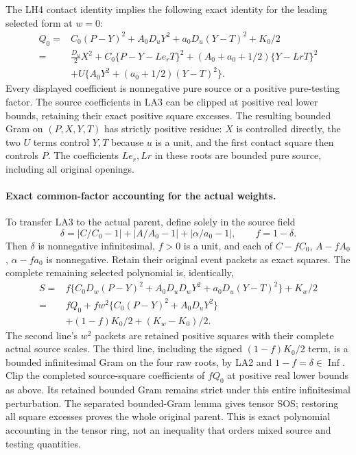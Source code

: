 The LH4 contact identity implies the following exact identity for
the leading selected form at $w=0$:
\[
\begin{split}
 Q_0={}&C_0(P-Y)^2+A_0D_uY^2+a_0D_u(Y-T)^2+K_0/2\\
 ={}&\frac{D_u}{2}X^2
       +C_0\{P-Y-Le_rT\}^2
       +(A_0+a_0+1/2)\{Y-LrT\}^2\\
 &+U\{A_0Y^2+(a_0+1/2)(Y-T)^2\}.
\end{split}                                                   \tag{LA3}
\]
Every displayed coefficient is nonnegative pure source or a positive
pure-testing factor.  The source coefficients in LA3 can be clipped
at positive real lower bounds, retaining their exact positive square
excesses.  The resulting bounded Gram on $(P,X,Y,T)$ has strictly
positive residue: $X$ is controlled directly, the two $U$ terms
control $Y,T$ because $u$ is a unit, and the first contact square
then controls $P$.  The coefficients $Le_r,Lr$ in these roots are
bounded pure source, including all original openings.

\paragraph{Exact common-factor accounting for the actual weights.}
To transfer LA3 to the actual parent, define solely in the source field
\[
 \delta=|C/C_0-1|+|A/A_0-1|+|\alpha/a_0-1|,
 \qquad f=1-\delta.
\]
Then $\delta$ is nonnegative infinitesimal, $f>0$ is a unit,
and each of $C-fC_0$, $A-fA_0$, $\alpha-fa_0$ is nonnegative.
Retain their original event packets as exact squares.  The complete
remaining selected polynomial is, identically,
\[
\begin{split}
 S={}&f\{C_0D_w(P-Y)^2+A_0D_uD_wY^2
                          +a_0D_u(Y-T)^2\}+K_w/2\\
  ={}&fQ_0+fw^2\{C_0(P-Y)^2+A_0D_uY^2\}\\
    &+(1-f)K_0/2+(K_w-K_0)/2.
\end{split} \tag{LA4}
\]
The second line's $w^2$ packets are retained positive squares with
their complete actual source scales.  The third line, including the
signed $(1-f)K_0/2$ term, is a bounded infinitesimal Gram on the
four raw roots, by LA2 and $1-f=\delta\in\operatorname{Inf}$.
Clip the completed source-square coefficients of $fQ_0$ at positive
real lower bounds as above.  Its retained bounded Gram remains
strict under this entire infinitesimal perturbation.  The separated
bounded-Gram lemma gives tensor SOS; restoring all square excesses
proves the whole original parent.  This is exact polynomial
accounting in the tensor ring, not an inequality that orders mixed
source and testing quantities.

